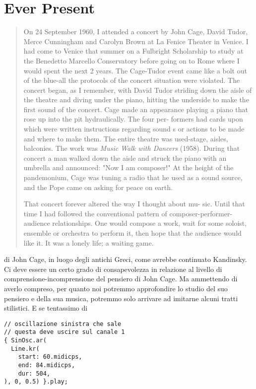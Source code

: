 \section*{Ever Present}

\begin{multicols}{2}

\begin{quote}
	On 24 September 1960, I attended a concert by John Cage, David Tudor, Merce Cunningham and Carolyn Brown at La
	Fenice Theater in Venice. I had come to Venice that summer on a Fulbright Scholarship to study at the Benedetto
	Marcello Conservatory before going on to Rome where I would spent the next 2 years. The Cage-Tudor event came
	like a bolt out of the blue-all the protocols of the concert situation were violated.
	The concert began, as I remember, with David Tudor striding down the aisle of the theatre and diving under
	the piano, hitting the underside to make the first sound of the concert. Cage made an appearance playing
	a piano that rose up into the pit hydraulically. The four per- formers had cards upon which were written instructions
	regarding sound s or actions to be made and where to make them. The entire theatre was used-stage, aisles, balconies.
	The work was \emph{Music Walk with Dancers} (1958). During that concert a man walked down the aisle and struck the piano
	with an umbrella and announced: "Now I am composer!" At the height of the pandemonium, Cage was tuning a radio
	that he used as a sound source, and the Pope came on asking for peace on earth.

	That concert forever altered the way I thought about mu- sic. Until that time I had followed the conventional pattern of
	composer-performer-audience relationships. One would compose a work, wait for some soloist, ensemble or orchestra to perform it, then hope that the audience would like it. It was a lonely life; a waiting game.
\end{quote}

di John Cage, in luogo degli antichi Greci, come avrebbe continuato Kandinsky.
Ci deve essere un certo grado di consapevolezza in relazione al livello di
comprensione-incomprensione del pensiero di John Cage. Ma ammettendo di
averlo compreso, per quanto noi potremmo approfondire lo studio del suo
pensiero e della sua musica, potremmo solo arrivare ad imitarne alcuni tratti
stilistici. E se tentassimo di

\begin{lstlisting}[style=SuperCollider-IDE]
// oscillazione sinistra che sale
// questa deve uscire sul canale 1
{ SinOsc.ar(
  Line.kr(
    start: 60.midicps,
    end: 84.midicps,
    dur: 504,
), 0, 0.5) }.play;


\end{lstlisting}
\end{multicols}
